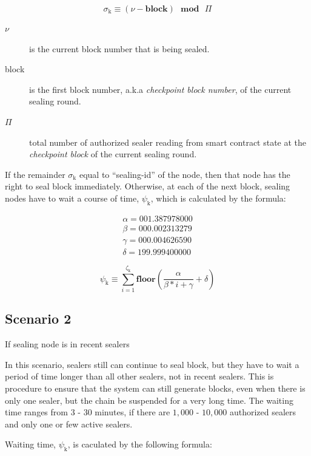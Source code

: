 \documentclass[12pt,oneside]{amsart}
\begin{document}
\begin{multicols}{2}
\begin{equation}\label{eq:sigma}
\sigma_{\mathrm{k}} \equiv (\nu - \mathbf{block}) \ \ \ \mathbf{mod} \ \ \ \Pi
\end{equation}

\begin{description}
\item[$\nu$] is the current block number that is being sealed.
\item[block] is the first block number, a.k.a \textit{checkpoint block number}, of the current sealing round.
\item[$\Pi$] total number of authorized sealer reading from smart contract state at the \textit{checkpoint block} of the current sealing round.
\end{description}

If the remainder $\sigma_{\mathrm{k}}$ equal to ``sealing-id'' of the node, then that node has the right to seal block immediately. Otherwise, at each of the next block, sealing nodes have to wait a course of time, $\psi_{\mathrm{k}}$, which is calculated by the formula:

\begin{eqnarray}
\alpha = 001.387978000 \\
\beta = 000.002313279 \\
\gamma = 000.004626590 \\
\delta = 199.999400000
\end{eqnarray}

\begin{equation}\label{eq:psi}
\psi_{\mathrm{k}} \equiv \sum_{i=1}^{\zeta_\mathrm{k}} \mathbf{floor}(\frac{\alpha}{\beta*i+\gamma} + \delta)
\end{equation}

\subsection{Scenario 2}\label{ch:scenario_2} If sealing node is in recent sealers

In this scenario, sealers still can continue to seal block, but they have to wait a period of time longer than all other sealers, not in recent sealers. This is procedure to ensure that the system can still generate blocks, even when there is only one sealer, but the chain be suspended for a very long time. The waiting time ranges from $3$ - $30$ minutes, if there are $1,000$ - $10,000$ authorized sealers and only one or few active sealers.

Waiting time, $\psi_{\mathrm{k}}$,  is caculated by the following formula:


\end{multicols}
\end{document}
